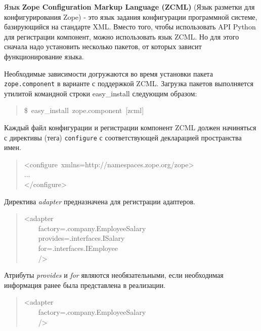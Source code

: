\documentclass[a4paper,openany,twoside,final]{book}
\providecommand*{\DUroletitlereference}[1]{\textsl{#1}}
\begin{document}
Язык \textbf{Zope Configuration Markup Language (ZCML)} (Язык разметки для
конфигурирования Zope) - это язык задания конфигурации программной
системе, базирующийся на стандарте XML.  Вместо того, чтобы
использовать API Python для регистрации компонент, можно использовать
язык ZCML.  Но для этого сначала надо установить несколько пакетов, от
которых зависит функционирование языка.

Необходимые зависимости догружаются во время установки пакета
\texttt{zope.component} в варианте с поддержкой ZCML.  Загрузка пакетов
выполняется утилитой командной строки easy\_install следующим образом:

\begin{quote}{\ttfamily \raggedright \noindent
\$~easy\_install~\textquotedbl{}zope.component~{[}zcml{]}\textquotedbl{}
}
\end{quote}

Каждый файл конфигурации и регистрации компонент ZCML должен
начиняться с директивы (тега) \texttt{configure} с соответствующей
декларацией пространства имен.

\begin{quote}{\ttfamily \raggedright \noindent
<configure~xmlns=\textquotedbl{}http://namespaces.zope.org/zope\textquotedbl{}>\\
...\\
</configure>
}
\end{quote}

Директива \DUroletitlereference{adapter} предназначена для регистрации адаптеров.

\begin{quote}{\ttfamily \raggedright \noindent
<adapter\\
~~~~factory=\textquotedbl{}.company.EmployeeSalary\textquotedbl{}\\
~~~~provides=\textquotedbl{}.interfaces.ISalary\textquotedbl{}\\
~~~~for=\textquotedbl{}.interfaces.IEmployee\textquotedbl{}\\
~~~~/>
}
\end{quote}

Атрибуты \DUroletitlereference{provides} и \DUroletitlereference{for} являются необязательными, если необходимая
информация ранее была представлена в реализации.

\begin{quote}{\ttfamily \raggedright \noindent
<adapter\\
~~~~factory=\textquotedbl{}.company.EmployeeSalary\textquotedbl{}\\
~~~~/>
}
\end{quote}
\end{document}
